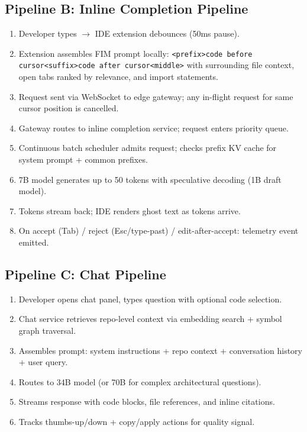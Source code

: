 \subsection*{Pipeline B: Inline Completion Pipeline}

\begin{enumerate}
  \item Developer types $\rightarrow$ IDE extension debounces (50ms pause).
  \item Extension assembles FIM prompt locally: \texttt{<prefix>code before cursor<suffix>code after cursor<middle>} with surrounding file context, open tabs ranked by relevance, and import statements.
  \item Request sent via WebSocket to edge gateway; any in-flight request for same cursor position is cancelled.
  \item Gateway routes to inline completion service; request enters priority queue.
  \item Continuous batch scheduler admits request; checks prefix KV cache for system prompt + common prefixes.
  \item 7B model generates up to 50 tokens with speculative decoding (1B draft model).
  \item Tokens stream back; IDE renders ghost text as tokens arrive.
  \item On accept (Tab) / reject (Esc/type-past) / edit-after-accept: telemetry event emitted.
\end{enumerate}

\subsection*{Pipeline C: Chat Pipeline}

\begin{enumerate}
  \item Developer opens chat panel, types question with optional code selection.
  \item Chat service retrieves repo-level context via embedding search + symbol graph traversal.
  \item Assembles prompt: system instructions + repo context + conversation history + user query.
  \item Routes to 34B model (or 70B for complex architectural questions).
  \item Streams response with code blocks, file references, and inline citations.
  \item Tracks thumbs-up/down + copy/apply actions for quality signal.
\end{enumerate}


